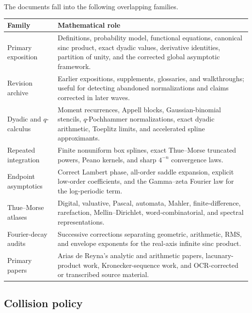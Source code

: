 \documentclass[11pt,oneside]{article}
\numberwithin{equation}{section}
\theoremstyle{definition}
\theoremstyle{remark}
\begin{document}
The documents fall into the following overlapping families.
\begin{longtable}{@{}p{}p{}@{}}
\toprule
Family & Mathematical role \\
\midrule
\endhead
Primary exposition & Definitions, probability model, functional equations,
canonical sinc product, exact dyadic values, derivative identities, partition of
unity, and the corrected global asymptotic framework. \\
Revision archive & Earlier expositions, supplements, glossaries, and walkthroughs;
useful for detecting abandoned normalizations and claims corrected in later waves. \\
Dyadic and $q$-calculus & Moment recurrences, Appell blocks, Gaussian-binomial
stencils, $q$-Pochhammer normalizations, exact dyadic arithmetic, Toeplitz limits,
and accelerated spline approximants. \\
Repeated integration & Finite nonuniform box splines, exact Thue--Morse truncated
powers, Peano kernels, and sharp $4^{-n}$ convergence laws. \\
Endpoint asymptotics & Correct Lambert phase, all-order saddle expansion, explicit
low-order coefficients, and the Gamma--zeta Fourier law for the log-periodic term. \\
Thue--Morse atlases & Digital, valuative, Pascal, automata, Mahler, finite-difference,
rarefaction, Mellin--Dirichlet, word-combinatorial, and spectral representations. \\
Fourier-decay audits & Successive corrections separating geometric, arithmetic,
RMS, and envelope exponents for the real-axis infinite sinc product. \\
Primary papers & Arias de Reyna's analytic and arithmetic papers, lacunary-product
work, Kronecker-sequence work, and OCR-corrected or transcribed source material. \\
\bottomrule
\end{longtable}

\subsection{Collision policy}
\end{document}
